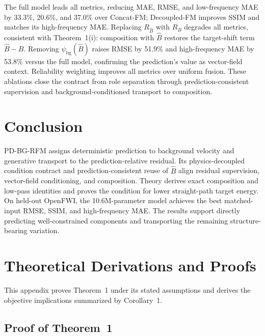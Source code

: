\documentclass[letterpaper]{article}
\newif\ifaaaiwithappendix
\begin{document}
The full model leads all metrics, reducing MAE, RMSE, and low-frequency MAE by 33.3\%, 20.6\%, and 37.0\% over Concat-FM; Decoupled-FM improves SSIM and matches its high-frequency MAE. Replacing $R_{\hat B}$ with $R_B$ degrades all metrics, consistent with Theorem~1(i): composition with $\hat B$ restores the target-shift term $\hat B-B$. Removing $\psi_{\mathrm{bg}}(\hat B)$ raises RMSE by 51.9\% and high-frequency MAE by 53.8\% versus the full model, confirming the prediction's value as vector-field context. Reliability weighting improves all metrics over uniform fusion. These ablations close the contract from role separation through prediction-consistent supervision and background-conditioned transport to composition.

\section{Conclusion}
PD-BG-RFM assigns deterministic prediction to background velocity and generative transport to the prediction-relative residual. Its physics-decoupled condition contract and prediction-consistent reuse of $\hat B$ align residual supervision, vector-field conditioning, and composition. Theory derives exact composition and low-pass identities and proves the condition for lower straight-path target energy. On held-out OpenFWI, the 10.6M-parameter model achieves the best matched-input RMSE, SSIM, and high-frequency MAE. The results support directly predicting well-constrained components and transporting the remaining structure-bearing variation.



\ifaaaiwithappendix
\clearpage
\setcounter{secnumdepth}{1}
\appendix
\section{Theoretical Derivations and Proofs}
\label{app:residual-proofs}
This appendix proves Theorem~1 under its stated assumptions and derives the objective implications summarized by Corollary~1.

\subsection{Proof of Theorem~1}
\end{document}
